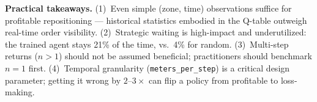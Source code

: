 \textbf{Practical takeaways.} (1)~Even simple (zone, time) observations suffice for profitable repositioning — historical statistics embodied in the Q-table outweigh real-time order visibility. (2)~Strategic waiting is high-impact and underutilized: the trained agent stays 21\% of the time, vs.\ 4\% for random. (3)~Multi-step returns ($n{>}1$) should not be assumed beneficial; practitioners should benchmark $n{=}1$ first. (4)~Temporal granularity (\texttt{meters\_per\_step}) is a critical design parameter; getting it wrong by $2$--$3{\times}$ can flip a policy from profitable to loss-making.
